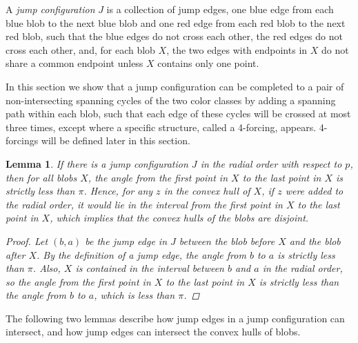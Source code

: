 \documentclass[12pt]{article}
\newtheorem{lemma}{Lemma}
\theoremstyle{definition}
\begin{document}
A \emph{jump configuration} $J$ is a collection of jump edges, one blue edge from each blue blob to the next  blue blob and one red edge from each red blob to the next red blob, such that the blue edges do not cross each other, the red edges do not cross each other, and, for each blob $X$, the two edges with endpoints in $X$ do not share a common endpoint unless $X$ contains only one point.

In this section we show that a jump configuration can be completed to a pair of non-intersecting spanning cycles of the two color classes by adding a spanning path within each blob, such that each edge of these cycles will be crossed at most three times, except where a specific structure, called a 4-forcing, appears.
4-forcings will be defined later in this section.

\begin{lemma}
  \label{lem:jump-config-blob-order}
  If there is a jump configuration $J$ in the radial order with respect to $p$, then for all blobs $X$, the angle from the first point in $X$ to the last point in $X$ is strictly less than $\pi$.
  Hence, for any $z$ in the convex hull of $X$, if $z$ were added to the radial order, it would lie in the interval from the first point in $X$ to the last point in $X$, which implies that the convex hulls of the blobs are disjoint.

  \begin{proof}
    Let $(b,a)$ be the jump edge in $J$ between the blob before $X$ and the blob after $X$.
    By the definition of a jump edge, the angle from $b$ to $a$ is strictly less than $\pi$.
    Also, $X$ is contained in the interval between $b$ and $a$ in the radial order, so the angle from the first point in $X$ to the last point in $X$ is strictly less than the angle from $b$ to $a$, which is less than $\pi$.
  \end{proof}
\end{lemma}


The following two lemmas describe how jump edges in a jump configuration can intersect, and how jump edges can intersect the convex hulls of blobs.
\end{document}
